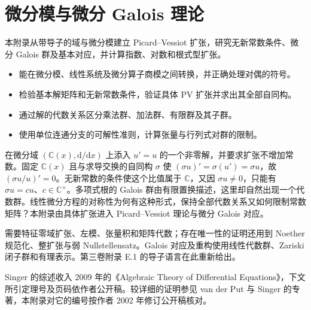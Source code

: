 
\chapter{微分模与微分 Galois 理论}
\label{b5:app:E}

\begin{chapterabstract}
	本附录从带导子的域与微分模建立 Picard--Vessiot 扩张，研究无新常数条件、微分 Galois 群及基本对应，并计算指数、对数和根式型扩张。
\end{chapterabstract}

\begin{learninggoals}
	\begin{itemize}
		\item 能在微分模、线性系统及微分算子商模之间转换，并正确处理对偶的符号。
		\item 检验基本解矩阵和无新常数条件，验证具体 PV 扩张并求出其全部自同构。
		\item 通过解的代数关系区分乘法群、加法群、有限群及其子群。
		\item 使用单位连通分支的可解性准则，计算张量与行列式对群的限制。
	\end{itemize}
\end{learninggoals}

在微分域 \((\mathbb C(x),\mathrm d/\mathrm dx)\) 上添入 \(u'=u\) 的一个非零解，并要求扩张不增加常数。固定 \(\mathbb C(x)\) 且与求导交换的自同构 \(\sigma\) 使 \((\sigma u)'=\sigma(u')=\sigma u\)，故 \((\sigma u/u)'=0\)。无新常数的条件使这个比值属于 \(\mathbb C\)，又因 \(\sigma u\ne0\)，只能有 \(\sigma u=cu\)、\(c\in\mathbb C^\times\)。多项式根的 Galois 群由有限置换描述，这里却自然出现一个代数群。线性微分方程的对称性为何有这种形式，保持全部代数关系又如何限制常数矩阵？本附录由具体扩张进入 Picard--Vessiot 理论与微分 Galois 对应。

\ProseParagraphBreak
需要特征零域扩张、左模、张量积和矩阵代数；存在唯一性的证明还用到 Noether 规范化、整扩张与弱 Nullstellensatz。Galois 对应及重构使用线性代数群、Zariski 闭子群和有理表示。第三卷附录 E.1 的导子语言在此重新给出。

\ProseParagraphBreak
Singer 的综述收入 2009 年的《Algebraic Theory of Differential Equations》\cite{Singer2009DifferentialGalois}，下文所引定理号及页码依作者公开稿。较详细的证明参见 van der Put 与 Singer 的专著\cite{VanDerPutSinger2003GaloisTheory}，本附录对它的编号按作者 2002 年修订公开稿核对。

